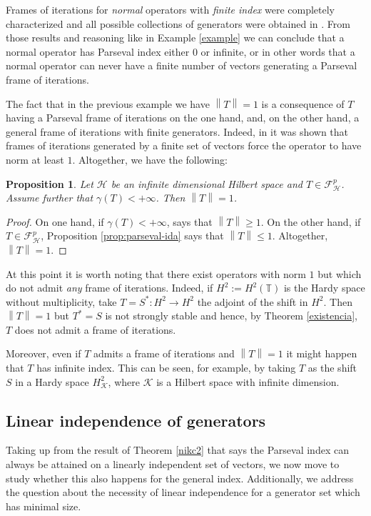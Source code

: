 \documentclass[a4paper,12pt]{amsart}
\def\cF{{\mathcal{F}}}
\def\HH{{\mathcal{H}}}
\def\KK{{\mathcal{K}}}
\def\cF{{\mathcal{F}}}
\newcommand{\norm}[1]{{\left\|{#1}\right\|}}
\newtheorem{proposition}[theorem]{Proposition}
\theoremstyle{definition}
\begin{document}
Frames of iterations for {\em normal} operators with {\em finite index} were completely characterized and all possible collections of generators were obtained in \cite{ACCMP17,ACMT,AP17,CMPP20,CMS21}. From those results and reasoning like in Example \ref{example} we can conclude that a normal operator has Parseval index either $0$ or infinite, or in other words that a normal operator can never have a finite number of vectors generating a Parseval frame of iterations.

The fact that in the previous example we have $\norm{T}=1$ is a consequence of $T$ having a Parseval frame of iterations on the one hand, and, on the other hand, a general frame of iterations with finite generators. Indeed, in \cite{AP17} it was shown that frames of iterations generated by a finite set of vectors force the operator to have norm at least $1$.
Altogether, we have the following:

\begin{proposition}\label{norma1}
Let $\HH$ be an infinite dimensional Hilbert space and $T\in\cF^p_\HH$. Assume further that $\gamma(T)<+\infty$. Then $\norm{T}=1$.
\end{proposition}
\begin{proof}
On one hand, if $\gamma(T)<+\infty$, \cite[Theorem 9]{AP17} says that $\norm{T}\geqslant1$. On the other hand, if $T\in\cF^p_\HH$, Proposition \ref{prop:parseval-ida} says that $\norm{T}\leqslant1$. Altogether, $\norm{T}=1$.
\end{proof}

At this point it is worth noting that there exist operators with norm $1$ but which do not admit {\em any} frame of iterations. Indeed, if $H^2:=H^2(\mathbb T)$ is the Hardy space without multiplicity, take $T=S^*:H^2\to H^2$ the adjoint of the shift in $H^2$. Then $\norm{T}=1$ but $T^*=S$ is not strongly stable and hence, by Theorem \ref{existencia}, $T$ does not admit a frame of iterations.

Moreover, even if $T$ admits a frame of iterations and $\norm{T}=1$ it might happen that $T$ has infinite index. This can be seen, for example, by taking $T$ as the shift $S$ in a Hardy space $H^2_\KK$, where $\KK$ is a Hilbert space with infinite dimension.

\subsection{Linear independence of generators}
Taking up from the result of Theorem \ref{nikc2} that says the Parseval index can always be attained on a linearly independent set of vectors, we now move to study whether this also happens for the general index. Additionally, we address the question about the necessity of linear independence for a generator set which has minimal size. 
\end{document}
